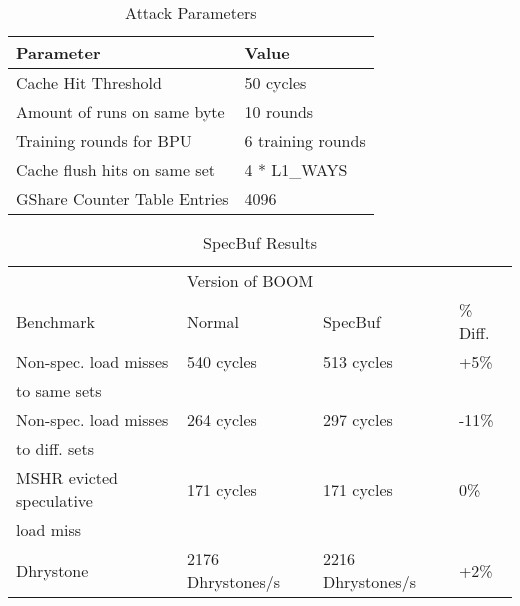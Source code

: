 \begin{table}
\centering
\caption{Attack Parameters}
\label{tab:attack-params}
\begin{tabular}{@{} *2l @{}} \toprule
    Parameter                    & Value \\ \midrule
    Cache Hit Threshold          & 50 cycles \\
    Amount of runs on same byte  & 10 rounds \\
    Training rounds for BPU      & 6 training rounds \\
    Cache flush hits on same set & 4 * L1\_WAYS \\
    GShare Counter Table Entries & 4096 \\ \bottomrule
\end{tabular}
\end{table} 

\begin{table}
\centering
\caption{SpecBuf Results}
\label{tab:spec-buf-results}
\begin{tabular}{@{} *4l @{}} \toprule
    & \multicolumn{2}{l}{Version of BOOM} & \\
    Benchmark                           & Normal & SpecBuf & \% Diff.\\ \midrule
    Non-spec. load misses   & 540 cycles & 513 cycles & +5\%    \\
    to same sets            &            &            & \\ \midrule
    Non-spec. load misses   & 264 cycles & 297 cycles & -11\%    \\ 
    to diff. sets           &            &            & \\ \midrule
    MSHR evicted speculative & 171 cycles & 171 cycles & 0\%    \\
    load miss                &            &            & \\ \midrule
    Dhrystone                           & 2176 Dhrystones/s & 2216 Dhrystones/s & +2\%\\ \bottomrule
\end{tabular}
\end{table}

